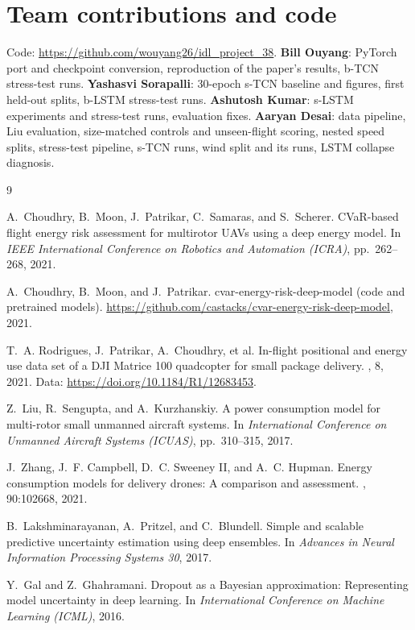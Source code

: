 \documentclass{article}
\begin{document}
\section*{Team contributions and code}
Code: \url{https://github.com/wouyang26/idl_project_38}.
\textbf{Bill Ouyang}: PyTorch port and checkpoint conversion, reproduction of the paper's results, b-TCN
stress-test runs.
\textbf{Yashasvi Sorapalli}: 30-epoch s-TCN baseline and figures, first held-out splits, b-LSTM stress-test runs.
\textbf{Ashutosh Kumar}: s-LSTM experiments and stress-test runs, evaluation fixes.
\textbf{Aaryan Desai}: data pipeline, Liu evaluation, size-matched controls and unseen-flight scoring, nested speed
splits, stress-test pipeline, s-TCN runs, wind split and its runs, LSTM collapse diagnosis.

\small
\begin{thebibliography}{9}

A.~Choudhry, B.~Moon, J.~Patrikar, C.~Samaras, and S.~Scherer.
\newblock CVaR-based flight energy risk assessment for multirotor UAVs using a deep energy model.
\newblock In {\it IEEE International Conference on Robotics and Automation (ICRA)}, pp.\ 262--268, 2021.

A.~Choudhry, B.~Moon, and J.~Patrikar.
\newblock cvar-energy-risk-deep-model (code and pretrained models).
\newblock \url{https://github.com/castacks/cvar-energy-risk-deep-model}, 2021.

T.~A. Rodrigues, J.~Patrikar, A.~Choudhry, et al.
\newblock In-flight positional and energy use data set of a DJI Matrice 100 quadcopter for small package delivery.
, 8, 2021. Data: \url{https://doi.org/10.1184/R1/12683453}.

Z.~Liu, R.~Sengupta, and A.~Kurzhanskiy.
\newblock A power consumption model for multi-rotor small unmanned aircraft systems.
\newblock In {\it International Conference on Unmanned Aircraft Systems (ICUAS)}, pp.\ 310--315, 2017.

J.~Zhang, J.~F. Campbell, D.~C. Sweeney II, and A.~C. Hupman.
\newblock Energy consumption models for delivery drones: A comparison and assessment.
, 90:102668, 2021.

B.~Lakshminarayanan, A.~Pritzel, and C.~Blundell.
\newblock Simple and scalable predictive uncertainty estimation using deep ensembles.
\newblock In {\it Advances in Neural Information Processing Systems 30}, 2017.

Y.~Gal and Z.~Ghahramani.
\newblock Dropout as a Bayesian approximation: Representing model uncertainty in deep learning.
\newblock In {\it International Conference on Machine Learning (ICML)}, 2016.

\end{thebibliography}
\end{document}

